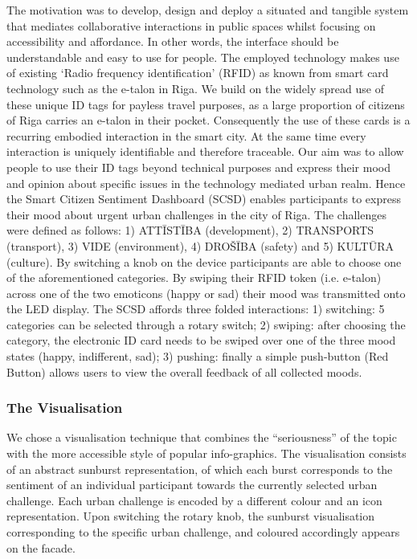 The motivation was to develop, design and deploy a situated and tangible system that mediates collaborative interactions in public spaces whilst focusing on accessibility and affordance. In other words, the interface should be understandable and easy to use for people. The employed technology makes use of existing ‘Radio frequency identification’ (RFID) as known from smart card technology such as the e-talon in Riga. We build on the widely spread use of these unique ID tags for payless travel purposes, as a large proportion of citizens of Riga carries an e-talon in their pocket. Consequently the use of these cards is a recurring embodied interaction in the smart city. At the same time every interaction is uniquely identifiable and therefore traceable. Our aim was to allow people to use their ID tags beyond technical purposes and express their mood and opinion about specific issues in the technology mediated urban realm. Hence the Smart Citizen Sentiment Dashboard (SCSD) enables participants to express their mood about urgent urban challenges in the city of Riga. The challenges were defined as follows: 1) ATTĪSTĪBA (development), 2) TRANSPORTS (transport), 3) VIDE (environment), 4) DROŠĪBA (safety) and 5) KULTŪRA (culture). By switching a knob on the device participants are able to choose one of the aforementioned categories. By swiping their RFID token (i.e. e-talon) across one of the two emoticons (happy or sad) their mood was transmitted onto the LED display. The SCSD affords three folded interactions: 1) switching: 5 categories can be selected through a rotary switch; 2) swiping: after choosing the category, the electronic ID card needs to be swiped over one of the three mood states (happy, indifferent, sad); 3) pushing: finally a simple push-button (Red Button) allows users to view the overall feedback of all collected moods.

\subsubsection{The Visualisation}

We chose a visualisation technique that combines the “seriousness” of the topic with the more accessible style of popular info-graphics. The visualisation consists of an abstract sunburst representation, of which each burst corresponds to the sentiment of an individual participant towards the currently selected urban challenge. Each urban challenge is encoded by a different colour and an icon representation. Upon switching the rotary knob, the sunburst visualisation corresponding to the specific urban challenge, and coloured accordingly appears on the facade.

